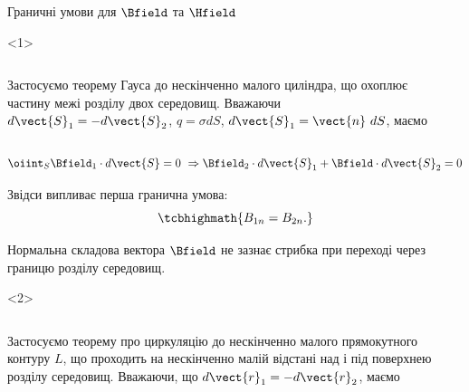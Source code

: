 \documentclass{beamer}
\begin{document}
\begin{frame}{Граничні умови для $\Bfield$ та $\Hfield$}{}
	\begin{onlyenv}
		\begin{columns}
			\begin{column}{0.6\linewidth}
				\begin{block}{}\scriptsize\justifying
					Застосуємо теорему Гауса до нескінченно малого циліндра, що охоплює частину межі
					розділу двох
					середовищ. Вважаючи $d\vect{S}_1 = - d\vect{S}_2$, $q = \sigma dS$,
					$d\vect{S}_1 =
						\vect{n}\ dS$,
					маємо
				\end{block}
			\end{column}
			\begin{column}{0.4\linewidth}\centering
				
			\end{column}
		\end{columns}
		\begin{block}{}\scriptsize
			\begin{equation*}
				\oiint_S \Bfield_1\cdot d\vect{S} = 0\ \Rightarrow  \Bfield_2\cdot
				d\vect{S}_1 +
				\Bfield\cdot d\vect{S}_2 = 0
			\end{equation*}
		\end{block}
		\begin{block}{}
			Звідси випливає перша гранична умова:
			\begin{equation*}
				\tcbhighmath{
					B_{1n} = B_{2n}.
				}
			\end{equation*}
		\end{block}
		\begin{alertblock}{}\justifying\scriptsize
			Нормальна складова вектора $\Bfield$ не зазнає стрибка при
			переході через границю розділу середовищ.
		\end{alertblock}
	\end{onlyenv}
	\begin{onlyenv}
		\begin{columns}
			\begin{column}{0.6\linewidth}
				\begin{block}{}\scriptsize\justifying
					Застосуємо теорему про циркуляцію до нескінченно малого прямокутного
					контуру $L$, що проходить на нескінченно малій відстані над і під поверхнею
					розділу середовищ. Вважаючи, що $d\vect{r}_1 = -d\vect{r}_2$, маємо
				\end{block}
			\end{column}

\end{columns}
\end{onlyenv}
\end{frame}
\end{document}
